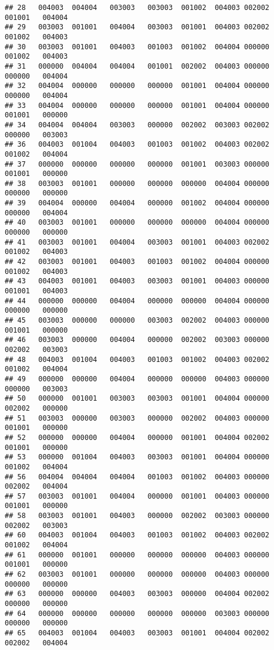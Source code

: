 \documentclass[
]{article}
\begin{document}
\begin{verbatim}
## 28   004003  004004   003003   003003  001002  004003 002002  001001   004004
## 29   003003  001001   004004   003003  001001  004003 002002  001002   004003
## 30   003003  001001   004003   001003  001002  004004 000000  001002   004003
## 31   000000  004004   004004   001001  002002  004003 000000  000000   004004
## 32   004004  000000   000000   000000  001001  004004 000000  000000   004004
## 33   004004  000000   000000   000000  001001  004004 000000  001001   000000
## 34   004004  004004   003003   000000  002002  003003 002002  000000   003003
## 36   004003  001004   004003   001003  001002  004003 002002  001002   004004
## 37   000000  000000   000000   000000  001001  003003 000000  001001   000000
## 38   003003  001001   000000   000000  000000  004004 000000  000000   000000
## 39   004004  000000   004004   000000  001002  004004 000000  000000   004004
## 40   003003  001001   000000   000000  000000  004004 000000  000000   000000
## 41   003003  001001   004004   003003  001001  004003 002002  001002   004003
## 42   003003  001001   004003   001003  001002  004004 000000  001002   004003
## 43   004003  001001   004003   003003  001001  004003 000000  001001   004003
## 44   000000  000000   004004   000000  000000  004004 000000  000000   000000
## 45   003003  000000   000000   003003  002002  004003 000000  001001   000000
## 46   003003  000000   004004   000000  002002  003003 000000  002002   003003
## 48   004003  001004   004003   001003  001002  004003 002002  001002   004004
## 49   000000  000000   004004   000000  000000  004003 000000  000000   003003
## 50   000000  001001   003003   003003  001001  004004 000000  002002   000000
## 51   003003  000000   003003   000000  002002  004003 000000  001001   000000
## 52   000000  000000   004004   000000  001001  004004 002002  001001   000000
## 53   000000  001004   004003   003003  001001  004004 000000  001002   004004
## 56   004004  004004   004004   001003  001002  004003 000000  002002   004004
## 57   003003  001001   004004   000000  001001  004003 000000  001001   000000
## 58   003003  001001   004003   000000  002002  003003 000000  002002   003003
## 60   004003  001004   004003   001003  001002  004003 002002  001002   004004
## 61   000000  001001   000000   000000  000000  004003 000000  001001   000000
## 62   003003  001001   000000   000000  000000  004003 000000  000000   000000
## 63   000000  000000   004003   003003  000000  004004 002002  000000   000000
## 64   000000  000000   000000   000000  000000  003003 000000  000000   000000
## 65   004003  001004   004003   003003  001001  004004 002002  002002   004004

\end{verbatim}
\end{document}

